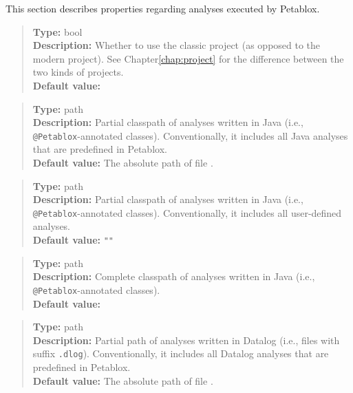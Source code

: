 This section describes properties regarding analyses executed by Petablox.

\begin{quote}
{\bf Type:} bool \\
{\bf Description:} Whether to use the classic project (as opposed to the modern
project).  See Chapter\ref{chap:project} for the difference
 between the two kinds of projects. \\
{\bf Default value:} 
\end{quote}

\begin{quote}
{\bf Type:} path \\
{\bf Description:} Partial classpath of analyses written in Java (i.e., {\tt @Petablox}-annotated classes).
Conventionally, it includes all Java analyses that are predefined in Petablox.  \\
{\bf Default value:} The absolute path of file .
\end{quote}

\begin{quote}
{\bf Type:} path \\
{\bf Description:} Partial classpath of analyses written in Java (i.e., {\tt @Petablox}-annotated classes).
Conventionally, it includes all user-defined analyses. \\
{\bf Default value:} {\tt ""}
\end{quote}

\begin{quote}
{\bf Type:} path \\
{\bf Description:} Complete classpath of analyses written in Java (i.e., {\tt @Petablox}-annotated classes). \\
{\bf Default value:} 
\end{quote}

\begin{quote}
{\bf Type:} path \\
{\bf Description:} Partial path of analyses written in Datalog (i.e., files with suffix {\tt .dlog}).
Conventionally, it includes all Datalog analyses that are predefined in Petablox. \\
{\bf Default value:} The absolute path of file .
\end{quote}

